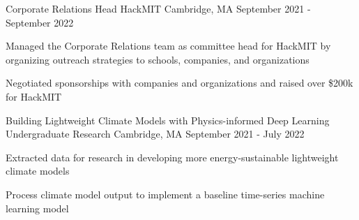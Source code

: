 \documentclass[12pt, letterpaper]{awesome-cv}
\begin{document}
\begin{cventries}
  \cventry
    {Corporate Relations Head} %
    {HackMIT} %
    {Cambridge, MA} %
    {September 2021 - September 2022} %
    {
      \begin{cvitems} %
        \item {Managed the Corporate Relations team as committee head for HackMIT by organizing outreach strategies to schools, companies, and organizations}
        \item {Negotiated sponsorships with companies and organizations and raised over \$200k for HackMIT}
      \end{cvitems}
    }

  \cventry
    {Building Lightweight Climate Models with Physics-informed Deep Learning } %
    {Undergraduate Research} %
    {Cambridge, MA} %
    {September 2021 - July 2022} %
    {
      \begin{cvitems} %
        \item {Extracted data for research in developing more energy-sustainable lightweight climate models}
        \item {Process climate model output to implement a baseline time-series machine learning model}
      \end{cvitems}
    }


  \end{cventries} 


\end{document}

